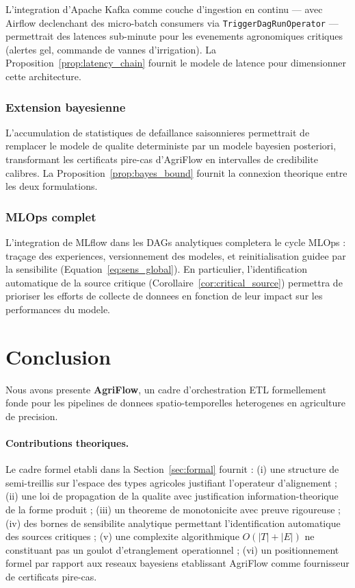 \documentclass[12pt,a4paper]{article}
\theoremstyle{plain}
\theoremstyle{definition}
\theoremstyle{remark}
\begin{document}
	L'integration d'Apache Kafka comme couche d'ingestion en continu ---
	avec Airflow declenchant des micro-batch consumers via
	\texttt{TriggerDagRunOperator} --- permettrait des latences
	sub-minute pour les evenements agronomiques critiques (alertes gel,
	commande de vannes d'irrigation). La Proposition~\ref{prop:latency_chain}
	fournit le modele de latence pour dimensionner cette architecture.
	
	\subsubsection{Extension bayesienne}
	
	L'accumulation de statistiques de defaillance saisonnieres permettrait
	de remplacer le modele de qualite deterministe par un modele bayesien
	posteriori, transformant les certificats pire-cas d'AgriFlow en
	intervalles de credibilite calibres. La Proposition~\ref{prop:bayes_bound}
	fournit la connexion theorique entre les deux formulations.
	
	\subsubsection{MLOps complet}
	
	L'integration de MLflow dans les DAGs analytiques completera le cycle
	MLOps : traçage des experiences, versionnement des modeles, et
	reinitialisation guidee par la sensibilite (Equation~\ref{eq:sens_global}).
	En particulier, l'identification automatique de la source critique
	(Corollaire~\ref{cor:critical_source}) permettra de prioriser les
	efforts de collecte de donnees en fonction de leur impact sur les
	performances du modele.
	
	\section{Conclusion}
	\label{sec:conclusion}
	
	Nous avons presente \textbf{AgriFlow}, un cadre d'orchestration ETL
	formellement fonde pour les pipelines de donnees spatio-temporelles
	heterogenes en agriculture de precision.
	
	\paragraph{Contributions theoriques.}
	Le cadre formel etabli dans la Section~\ref{sec:formal} fournit :
	(i) une structure de semi-treillis sur l'espace des types agricoles
	justifiant l'operateur d'alignement ;
	(ii) une loi de propagation de la qualite avec justification
	information-theorique de la forme produit ;
	(iii) un theoreme de monotonicite avec preuve rigoureuse ;
	(iv) des bornes de sensibilite analytique permettant l'identification
	automatique des sources critiques ;
	(v) une complexite algorithmique $O(|T|+|E|)$ ne constituant pas un
	goulot d'etranglement operationnel ;
	(vi) un positionnement formel par rapport aux reseaux bayesiens
	etablissant AgriFlow comme fournisseur de certificats pire-cas.
	
\end{document}
